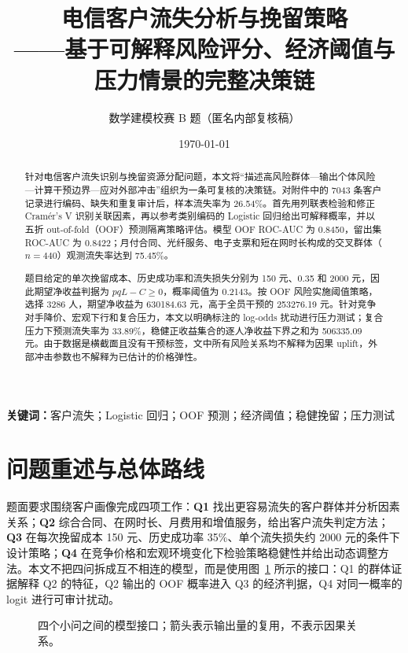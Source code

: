 \documentclass[UTF8,a4paper,11pt]{ctexart}
\title{\vspace{-1.0cm}\textbf{电信客户流失分析与挽留策略}\\[2mm]
  \large——基于可解释风险评分、经济阈值与压力情景的完整决策链}
\author{数学建模校赛 B 题\quad（匿名内部复核稿）}
\date{\today}
\begin{document}
\maketitle
\begin{abstract}
针对电信客户流失识别与挽留资源分配问题，本文将“描述高风险群体—输出个体风险—计算干预边界—应对外部冲击”组织为一条可复核的决策链。对附件中的 7043 条客户记录进行编码、缺失和重复审计后，样本流失率为 26.54\%。首先用列联表检验和修正 Cramér's V 识别关联因素，再以参考类别编码的 Logistic 回归给出可解释概率，并以五折 out-of-fold（OOF）预测隔离策略评估。模型 OOF ROC-AUC 为 0.8450，留出集 ROC-AUC 为 0.8422；月付合同、光纤服务、电子支票和短在网时长构成的交叉群体（\(n=440\)）观测流失率达到 75.45\%。

题目给定的单次挽留成本、历史成功率和流失损失分别为 150 元、0.35 和 2000 元，因此期望净收益判据为 \(p q L-C\geq0\)，概率阈值为 0.2143。按 OOF 风险实施阈值策略，选择 3286 人，期望净收益为 630184.63 元，高于全员干预的 253276.19 元。针对竞争对手降价、宏观下行和复合压力，本文以明确标注的 log-odds 扰动进行压力测试；复合压力下预测流失率为 33.89\%，稳健正收益集合的逐人净收益下界之和为 506335.09 元。由于数据是横截面且没有干预标签，文中所有风险关系均不解释为因果 uplift，外部冲击参数也不解释为已估计的价格弹性。
\end{abstract}

\noindent\textbf{关键词：}客户流失；Logistic 回归；OOF 预测；经济阈值；稳健挽留；压力测试

\section{问题重述与总体路线}\label{sec:problem}

题面要求围绕客户画像完成四项工作：\textbf{Q1} 找出更容易流失的客户群体并分析因素关系；\textbf{Q2} 综合合同、在网时长、月费用和增值服务，给出客户流失判定方法；\textbf{Q3} 在每次挽留成本 150 元、历史成功率 35\%、单个流失损失约 2000 元的条件下设计策略；\textbf{Q4} 在竞争价格和宏观环境变化下检验策略稳健性并给出动态调整方法。本文不把四问拆成互不相连的模型，而是使用图~\ref{fig:route} 所示的接口：Q1 的群体证据解释 Q2 的特征，Q2 输出的 OOF 概率进入 Q3 的经济判据，Q4 对同一概率的 logit 进行可审计扰动。

\begin{figure}[H]
  \centering
  \caption{四个小问之间的模型接口；箭头表示输出量的复用，不表示因果关系。}
  \label{fig:route}
\end{figure}
\end{document}
